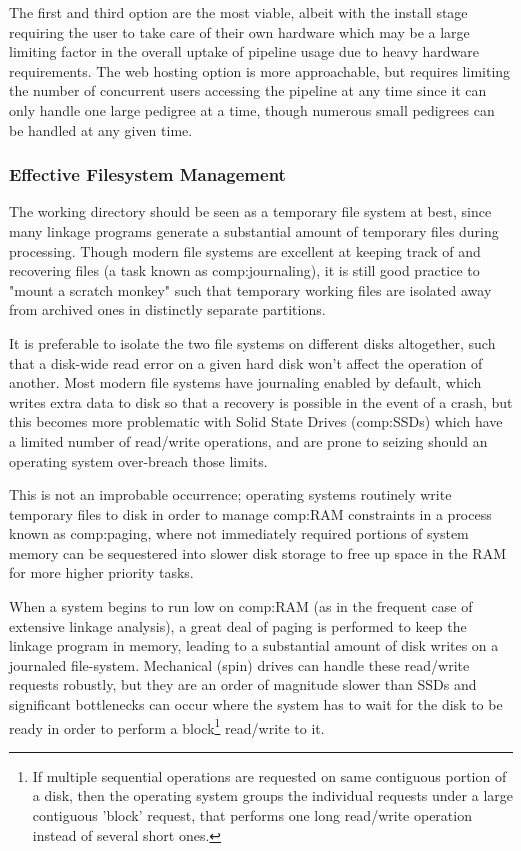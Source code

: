 The first and third option are the most viable, albeit with the install stage requiring the user to take care of their own hardware which may be a large limiting factor in the overall uptake of pipeline usage due to heavy hardware requirements. The web hosting option is more approachable, but requires limiting the number of concurrent users accessing the pipeline at any time since it can only handle one large pedigree at a time, though numerous small pedigrees can be handled at any given time.



\subsubsection{Effective Filesystem Management}

The working directory should be seen as a temporary file system at best, since many linkage programs generate a substantial amount of temporary files during processing. Though modern file systems are excellent at keeping track of and recovering files (a task known as \gls{comp:journaling}), it is still good practice to "mount a scratch monkey" such that temporary working files are isolated away from archived ones in distinctly separate partitions.

It is preferable to isolate the two file systems on different disks altogether, such that a disk-wide read error on a given hard disk won't affect the operation of another. Most modern file systems have journaling enabled by default, which writes extra data to disk so that a recovery is possible in the event of a crash, but this becomes more problematic with Solid State Drives (\gls{comp:SSD}s) which have a limited number of read/write operations, and are prone to seizing should an operating system over-breach those limits.

This is not an improbable occurrence; operating systems routinely write temporary files to disk in order to manage \gls{comp:RAM} constraints in a process known as \gls{comp:paging}, where not immediately required portions of system memory can be sequestered into slower disk storage to free up space in the RAM for more higher priority tasks.

When a system begins to run low on \gls{comp:RAM} (as in the frequent case of extensive linkage analysis), a great deal of paging is performed to keep the linkage program in memory, leading to a substantial amount of disk writes on a journaled file-system. Mechanical (spin) drives can handle these read/write requests robustly, but they are an order of magnitude slower than SSDs and significant bottlenecks can occur where the system has to wait for the disk to be ready in order to perform a block\footnote{If multiple sequential operations are requested on same contiguous portion of a disk, then the operating system groups the individual requests under a large contiguous 'block' request, that performs one long read/write operation instead of several short ones.}    read/write to it.


